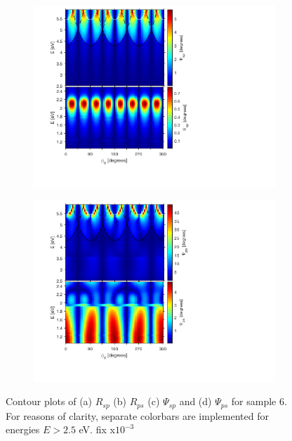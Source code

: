 \begin{figure}[h]
    \begin{subfigure}{0.5\textwidth}
        \centering
        \includegraphics[width=\linewidth, trim=1.1cm 1.8cm 6.7cm 0.3cm, clip]{figures/ch4/S6/contour/S6_Psisp.png}
        \caption{}
    \end{subfigure}
    \begin{subfigure}{0.5\textwidth}
        \centering
        \includegraphics[width=\linewidth, trim=1.1cm 1.8cm 6.7cm 0.3cm, clip]{figures/ch4/S6/contour/S6_Psips.png}
        \caption{}
    \end{subfigure}
    \caption{Contour plots of (a) $R_{sp}$ (b) $R_{ps}$ (c) $\Psi_{sp}$ and (d) $\Psi_{ps}$ for sample 6. For reasons of clarity, separate colorbars are implemented for energies $E>2.5$ eV. \color{red}fix x$10^{-3}$}
    \label{fig:S6_contour_Rsp&Rps_Psisp&Psips}
\end{figure}




